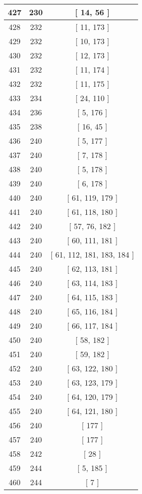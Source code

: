 \begin{center}
\begin{longtable}[H]{|| c c c ||}
\hline
427 & 230 & [ 14, 56 ] \\ 
\hline
428 & 232 & [ 11, 173 ] \\ 
\hline
429 & 232 & [ 10, 173 ] \\ 
\hline
430 & 232 & [ 12, 173 ] \\ 
\hline
431 & 232 & [ 11, 174 ] \\ 
\hline
432 & 232 & [ 11, 175 ] \\ 
\hline
433 & 234 & [ 24, 110 ] \\ 
\hline
434 & 236 & [ 5, 176 ] \\ 
\hline
435 & 238 & [ 16, 45 ] \\ 
\hline
436 & 240 & [ 5, 177 ] \\ 
\hline
437 & 240 & [ 7, 178 ] \\ 
\hline
438 & 240 & [ 5, 178 ] \\ 
\hline
439 & 240 & [ 6, 178 ] \\ 
\hline
440 & 240 & [ 61, 119, 179 ] \\ 
\hline
441 & 240 & [ 61, 118, 180 ] \\ 
\hline
442 & 240 & [ 57, 76, 182 ] \\ 
\hline
443 & 240 & [ 60, 111, 181 ] \\ 
\hline
444 & 240 & [ 61, 112, 181, 183, 184 ] \\ 
\hline
445 & 240 & [ 62, 113, 181 ] \\ 
\hline
446 & 240 & [ 63, 114, 183 ] \\ 
\hline
447 & 240 & [ 64, 115, 183 ] \\ 
\hline
448 & 240 & [ 65, 116, 184 ] \\ 
\hline
449 & 240 & [ 66, 117, 184 ] \\ 
\hline
450 & 240 & [ 58, 182 ] \\ 
\hline
451 & 240 & [ 59, 182 ] \\ 
\hline
452 & 240 & [ 63, 122, 180 ] \\ 
\hline
453 & 240 & [ 63, 123, 179 ] \\ 
\hline
454 & 240 & [ 64, 120, 179 ] \\ 
\hline
455 & 240 & [ 64, 121, 180 ] \\ 
\hline
456 & 240 & [ 177 ] \\ 
\hline
457 & 240 & [ 177 ] \\ 
\hline
458 & 242 & [ 28 ] \\ 
\hline
459 & 244 & [ 5, 185 ] \\ 
\hline
460 & 244 & [ 7 ] \\ 

\end{longtable}
\end{center}
